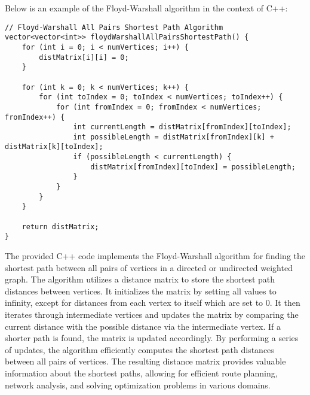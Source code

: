 \begin{solution}

Below is an example of the Floyd-Warshall algorithm in the context of C++:

\horizontalline

\begin{verbatim}
// Floyd-Warshall All Pairs Shortest Path Algorithm
vector<vector<int>> floydWarshallAllPairsShortestPath() {
    for (int i = 0; i < numVertices; i++) {
        distMatrix[i][i] = 0;
    }

    for (int k = 0; k < numVertices; k++) {
        for (int toIndex = 0; toIndex < numVertices; toIndex++) {
            for (int fromIndex = 0; fromIndex < numVertices; fromIndex++) {
                int currentLength = distMatrix[fromIndex][toIndex];
                int possibleLength = distMatrix[fromIndex][k] + distMatrix[k][toIndex];
                if (possibleLength < currentLength) {
                    distMatrix[fromIndex][toIndex] = possibleLength;
                }
            }
        }
    }

    return distMatrix;
}
\end{verbatim}

\horizontalline

The provided C++ code implements the Floyd-Warshall algorithm for finding the shortest path between all pairs of vertices in a directed or undirected weighted graph. The algorithm utilizes a distance matrix to store the shortest 
path distances between vertices. It initializes the matrix by setting all values to infinity, except for distances from each vertex to itself which are set to 0. It then iterates through intermediate vertices and updates the matrix 
by comparing the current distance with the possible distance via the intermediate vertex. If a shorter path is found, the matrix is updated accordingly. By performing a series of updates, the algorithm efficiently computes the 
shortest path distances between all pairs of vertices. The resulting distance matrix provides valuable information about the shortest paths, allowing for efficient route planning, network analysis, and solving optimization problems 
in various domains.
    
\end{solution}